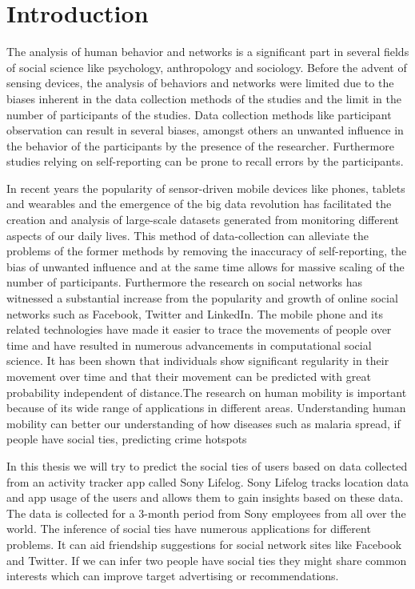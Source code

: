 \chapter{Introduction}
\label{chap:Introduction}

The analysis of human behavior and networks is a significant part in several fields of social science like psychology, anthropology and sociology. Before the advent of sensing devices, the analysis of behaviors and networks were limited due to the biases inherent in the data collection methods of the studies and the limit in the number of participants of the studies. Data collection methods like participant observation can result in several biases, amongst others an unwanted influence in the behavior of the participants by the presence of the researcher\cite{rosenthal1966experimenter}. Furthermore studies relying on self-reporting can be prone to recall errors by the participants\cite{stone1999science}.

In recent years the popularity of sensor-driven mobile devices like phones, tablets and wearables and the emergence of the big data revolution has facilitated the creation and analysis of large-scale datasets generated from monitoring different aspects of our daily lives\cite{lazer2009life}. This method of data-collection can alleviate the problems of the former methods by removing the inaccuracy of self-reporting, the bias of unwanted influence and at the same time allows for massive scaling of the number of participants. Furthermore the research on social networks has witnessed a substantial increase from the popularity and growth of online social networks such as Facebook, Twitter and LinkedIn\cite{social_networks}. The mobile phone and its related technologies have made it easier to trace the movements of people over time and have resulted in numerous advancements in computational social science. It has been shown that individuals show significant regularity in their movement over time\cite{gonzalez2008understanding} and that their movement can be predicted with great probability independent of distance\cite{song2010limits}.The research on human mobility is important because of its wide range of applications in different areas. Understanding human mobility can better our understanding of how diseases such as malaria spread\cite{wesolowski2012quantifying}, if people have social ties\cite{ISTfGC}, predicting crime hotspots\cite{bogomolov2014once}

In this thesis we will try to predict the social ties of users based on data collected from an activity tracker app called Sony Lifelog\cite{sonyLifeLog}. Sony Lifelog tracks location data and app usage of the users and allows them to gain insights based on these data. The data is collected for a 3-month period from Sony employees from all over the world.
The inference of social ties have numerous applications for different problems. It can aid friendship suggestions for social network sites like Facebook and Twitter. If we can infer two people have social ties they might share common interests which can improve target advertising or recommendations\cite{yu2015investigating}.


